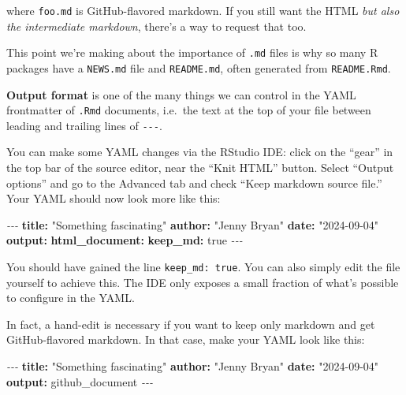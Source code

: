 \documentclass[
]{book}
\newenvironment{Shaded}{\begin{snugshade}}{\end{snugshade}}
\newcommand{\AttributeTok}[1]{\textcolor[rgb]{0.13,0.29,0.53}{#1}}
\newcommand{\CharTok}[1]{\textcolor[rgb]{0.31,0.60,0.02}{#1}}
\newcommand{\FunctionTok}[1]{\textcolor[rgb]{0.13,0.29,0.53}{\textbf{#1}}}
\newcommand{\KeywordTok}[1]{\textcolor[rgb]{0.13,0.29,0.53}{\textbf{#1}}}
\newcommand{\PreprocessorTok}[1]{\textcolor[rgb]{0.56,0.35,0.01}{\textit{#1}}}
\newcommand{\StringTok}[1]{\textcolor[rgb]{0.31,0.60,0.02}{#1}}
\begin{document}
where \texttt{foo.md} is GitHub-flavored markdown.
If you still want the HTML \emph{but also the intermediate markdown}, there's a way to request that too.

This point we're making about the importance of \texttt{.md} files is why so many R packages have a \texttt{NEWS.md} file and \texttt{README.md}, often generated from \texttt{README.Rmd}.

\textbf{Output format} is one of the many things we can control in the YAML frontmatter of \texttt{.Rmd} documents, i.e.~the text at the top of your file between leading and trailing lines of \texttt{-\/-\/-}.

You can make some YAML changes via the RStudio IDE: click on the ``gear'' in the top bar of the source editor, near the ``Knit HTML'' button.
Select ``Output options'' and go to the Advanced tab and check ``Keep markdown source file.''
Your YAML should now look more like this:

\begin{Shaded}
\begin{Highlighting}[]
\PreprocessorTok{{-}{-}{-}}
\FunctionTok{title}\KeywordTok{:}\AttributeTok{ }\StringTok{"Something fascinating"}
\FunctionTok{author}\KeywordTok{:}\AttributeTok{ }\StringTok{"Jenny Bryan"}
\FunctionTok{date}\KeywordTok{:}\AttributeTok{ }\StringTok{"2024{-}09{-}04"}
\FunctionTok{output}\KeywordTok{:}
\AttributeTok{  }\FunctionTok{html\_document}\KeywordTok{:}
\AttributeTok{    }\FunctionTok{keep\_md}\KeywordTok{:}\AttributeTok{ }\CharTok{true}
\PreprocessorTok{{-}{-}{-}}
\end{Highlighting}
\end{Shaded}

You should have gained the line \texttt{keep\_md:\ true}.
You can also simply edit the file yourself to achieve this.
The IDE only exposes a small fraction of what's possible to configure in the YAML.

In fact, a hand-edit is necessary if you want to keep only markdown and get GitHub-flavored markdown.
In that case, make your YAML look like this:

\begin{Shaded}
\begin{Highlighting}[]
\PreprocessorTok{{-}{-}{-}}
\FunctionTok{title}\KeywordTok{:}\AttributeTok{ }\StringTok{"Something fascinating"}
\FunctionTok{author}\KeywordTok{:}\AttributeTok{ }\StringTok{"Jenny Bryan"}
\FunctionTok{date}\KeywordTok{:}\AttributeTok{ }\StringTok{"2024{-}09{-}04"}
\FunctionTok{output}\KeywordTok{:}\AttributeTok{ github\_document}
\PreprocessorTok{{-}{-}{-}}
\end{Highlighting}
\end{Shaded}
\end{document}
